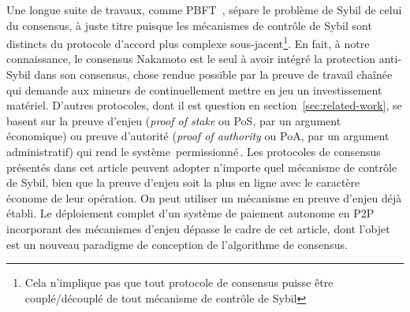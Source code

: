 \documentclass[letterpaper,twocolumn,10pt]{article}
\theoremstyle{definition}
\begin{document}
Une longue suite de travaux, comme PBFT~\cite{castro1999practical}, sépare le problème de Sybil de celui du consensus, à juste titre puisque les mécanismes de contrôle de Sybil sont distincts du protocole d'accord plus complexe sous-jacent\footnote{Cela n'implique pas que tout protocole de consensus puisse être couplé/découplé de tout mécanisme de contrôle de Sybil}.
En fait, à notre connaissance, le consensus Nakamoto est le seul à avoir intégré la protection anti-Sybil dans son consensus, chose rendue possible par la preuve de travail chaînée~\cite{aspnes2005exposing} qui demande aux mineurs de continuellement mettre en jeu un investissement matériel.
D'autres protocoles, dont il est question en section~\ref{sec:related-work}, se basent sur la preuve d'enjeu (\emph{proof of stake} ou PoS, par un argument économique) ou preuve d'autorité (\emph{proof of authority} ou PoA, par un argument administratif) qui rend le système \guillemotleft\,permissionné\,\guillemotright.
Les protocoles de consensus présentés dans cet article peuvent adopter n'importe quel mécanisme de contrôle de Sybil, bien que la preuve d'enjeu soit la plus en ligne avec le caractère économe de leur opération.
On peut utiliser un mécanisme en preuve d'enjeu déjà établi.
Le déploiement complet d'un système de paiement autonome en P2P incorporant des mécanismes d'enjeu dépasse le cadre de cet article, dont l'objet est un nouveau paradigme de conception de l'algorithme de consensus.
\end{document}
